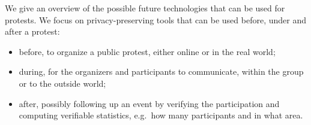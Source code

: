 We give an overview of the possible future technologies that can be used for 
protests.
We focus on privacy-preserving tools that can be used before, under and after 
a protest:
\begin{itemize}
  \item before, to organize a public protest, either online or in the real 
    world;
  \item during, for the organizers and participants to communicate, within 
    the group or to the outside world;
  \item after, possibly following up an event by verifying the participation 
    and computing verifiable statistics, e.g.\ how many participants and in 
    what area.
\end{itemize}


